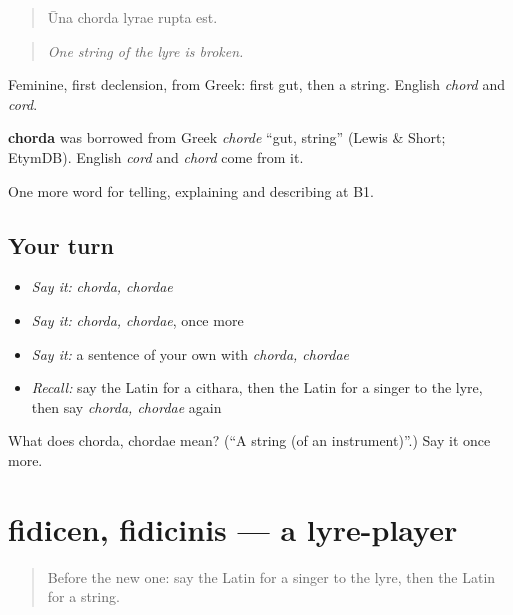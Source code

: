 \begin{quote}
Ūna chorda lyrae rupta est.
\end{quote}

\begin{quote}
\emph{One string of the lyre is broken.}
\end{quote}

Feminine, first declension, from Greek: first gut, then a string. English \emph{chord} and \emph{cord}.

\begin{cousinweb}
\textbf{chorda} was borrowed from Greek \emph{chorde} \textquotedblleft{}gut, string\textquotedblright{} (Lewis \& Short; EtymDB). English \emph{cord} and \emph{chord} come from it.
\end{cousinweb}

\begin{grammarlens}[title={What you've built}]
One more word for telling, explaining and describing at B1.
\end{grammarlens}

\subsection*{Your turn}
\begin{itemize}
\raggedright
  \item \emph{Say it:} \emph{chorda, chordae}
  \item \emph{Say it:} \emph{chorda, chordae}, once more
  \item \emph{Say it:} a sentence of your own with \emph{chorda, chordae}
  \item \emph{Recall:} say the Latin for a cithara, then the Latin for a singer to the lyre, then say \emph{chorda, chordae} again
\end{itemize}

\begin{tcolorbox}[breakable,colback=teal!4,colframe=teal!35!black,title={Before you move on}]
What does chorda, chordae mean? (\textquotedblleft{}A string (of an instrument)\textquotedblright{}.) Say it once more.
\end{tcolorbox}
\section[fidicen, fidicinis]{fidicen, fidicinis — a lyre-player}

\label{lesson:LA-C544-fidicen}



\begin{quote}
Before the new one: say the Latin for a singer to the lyre, then the Latin for a string.
\end{quote}

